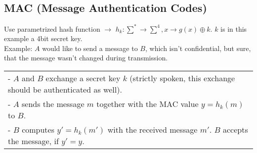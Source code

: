 \subsection{MAC (Message Authentication Codes)}
Use parametrized hash function $\to$ $h_k: \sum^* \to \sum^4, x \to g(x) \oplus k$. $k$ is in this example a 4bit secret key.\\
Example: $A$ would like to send a message to $B$, which isn't confidential, but sure, that the message wasn't changed during transmission.\\
\begin{tabular}{l}
	- $A$ and $B$ exchange a secret key $k$ (strictly spoken, this exchange should be authenticated as well).\\
	- $A$ sends the message $m$ together with the MAC value $y=h_k(m)$ to $B$.\\
	- $B$ computes $y'=h_k(m')$ with the received message $m'$. $B$ accepts the message, if $y'=y$.
\end{tabular}

